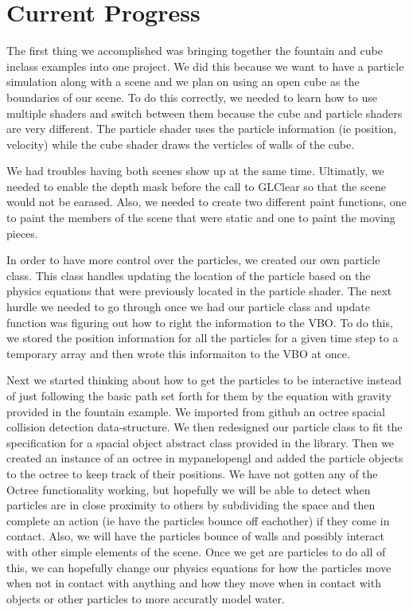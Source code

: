 \section{Current Progress}

The first thing we accomplished was bringing together the fountain and cube inclass examples into one project. We did this because we want to have a particle simulation along with a scene and we plan on using an open cube as the boundaries of our scene. To do this correctly, we needed to learn how to use multiple shaders and switch between them because the cube and particle shaders are very different. The particle shader uses the particle information (ie position, velocity) while the cube shader draws the verticles of walls of the cube.

We had troubles having both scenes show up at the same time. Ultimatly, we needed to enable the depth mask before the call to GLClear so that the scene would not be earased. Also, we needed to create two different paint functions, one to paint the members of the scene that were static and one to paint the moving pieces. 

In order to have more control over the particles, we created our own particle class. This class handles updating the location of the particle based on the physics equations that were previously located in the particle shader. The next hurdle we needed to go through once we had our particle class and update function was figuring out how to right the information to the VBO. To do this, we stored the position information for all the particles for a given time step to a temporary array and then wrote this informaiton to the VBO at once. 

Next we started thinking about how to get the particles to be interactive instead of just following the basic path set forth for them by the equation with gravity provided in the fountain example. We imported from github an octree spacial collision detection data-structure. We then redesigned our particle class to fit the specification for a spacial object abstract class provided in the library. Then we created an instance of an octree in mypanelopengl and added the particle objects to the octree to keep track of their positions. We have not gotten any of the Octree functionality working, but hopefully we will be able to detect when particles are in close proximity to others by subdividing the space and then complete an action (ie have the particles bounce off eachother) if they come in contact. Also, we will have the particles bounce of walls and possibly interact with other simple elements of the scene. Once we get are particles to do all of this, we can hopefully change our physics equations for how the particles move when not in contact with anything and how they move when in contact with objects or other particles to more accuratly model water. 

